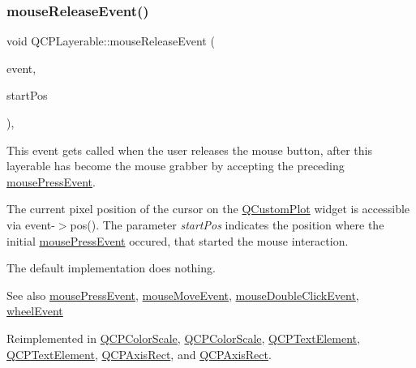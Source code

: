 \subsubsection{\texorpdfstring{mouse\+Release\+Event()}{mouseReleaseEvent()}}
{\footnotesize\ttfamily void Q\+C\+P\+Layerable\+::mouse\+Release\+Event (\begin{DoxyParamCaption}\item[{Q\+Mouse\+Event $\ast$}]{event,  }\item[{const Q\+PointF \&}]{start\+Pos }\end{DoxyParamCaption})\hspace{0.3cm}{\ttfamily [protected]}, {\ttfamily [virtual]}}

This event gets called when the user releases the mouse button, after this layerable has become the mouse grabber by accepting the preceding \hyperlink{class_q_c_p_layerable_af6567604818db90f4fd52822f8bc8376}{mouse\+Press\+Event}.

The current pixel position of the cursor on the \hyperlink{class_q_custom_plot}{Q\+Custom\+Plot} widget is accessible via {\ttfamily event-\/$>$pos()}. The parameter {\itshape start\+Pos} indicates the position where the initial \hyperlink{class_q_c_p_layerable_af6567604818db90f4fd52822f8bc8376}{mouse\+Press\+Event} occured, that started the mouse interaction.

The default implementation does nothing.

\begin{DoxySeeAlso}{See also}
\hyperlink{class_q_c_p_layerable_af6567604818db90f4fd52822f8bc8376}{mouse\+Press\+Event}, \hyperlink{class_q_c_p_layerable_a9eee1ba47fd69be111059ca3881933e4}{mouse\+Move\+Event}, \hyperlink{class_q_c_p_layerable_a4171e2e823aca242dd0279f00ed2de81}{mouse\+Double\+Click\+Event}, \hyperlink{class_q_c_p_layerable_a47dfd7b8fd99c08ca54e09c362b6f022}{wheel\+Event} 
\end{DoxySeeAlso}


Reimplemented in \hyperlink{class_q_c_p_color_scale_a6a35dd39ab4e5cb2d7b29ebb4d5b61b0}{Q\+C\+P\+Color\+Scale}, \hyperlink{class_q_c_p_color_scale_ae19d4f32e96db2bd26be8956d6444e26}{Q\+C\+P\+Color\+Scale}, \hyperlink{class_q_c_p_text_element_acfcbaf9b1da18745e72726aafb39c855}{Q\+C\+P\+Text\+Element}, \hyperlink{class_q_c_p_text_element_a97d566f46653bb0b00a2c1556e6c1f7e}{Q\+C\+P\+Text\+Element}, \hyperlink{class_q_c_p_axis_rect_a6c89b988d3a0b93c0878f0ebdb5037f4}{Q\+C\+P\+Axis\+Rect}, and \hyperlink{class_q_c_p_axis_rect_ae4d536756ccd48928e8b3c475d8384b1}{Q\+C\+P\+Axis\+Rect}.

